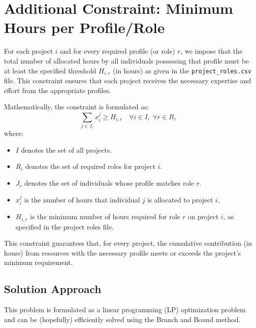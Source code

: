\documentclass{article}
\begin{document}
\section*{Additional Constraint: Minimum Hours per Profile/Role}

For each project \( i \) and for every required profile (or role) \( r \), we impose that the total number of allocated hours by all individuals possessing that profile must be at least the specified threshold \( H_{i,r} \) (in hours) as given in the \texttt{project\_roles.csv} file. This constraint ensures that each project receives the necessary expertise and effort from the appropriate profiles.

Mathematically, the constraint is formulated as:
\[
\sum_{j \in J_r} x_i^j \ge H_{i,r} \quad \forall i \in I,\; \forall r \in R_i
\]
where:
\begin{itemize}
	\item \( I \) denotes the set of all projects.
	\item \( R_i \) denotes the set of required roles for project \( i \).
	\item \( J_r \) denotes the set of individuals whose profile matches role \( r \).
	\item \( x_i^j \) is the number of hours that individual \( j \) is allocated to project \( i \).
	\item \( H_{i,r} \) is the minimum number of hours required for role \( r \) on project \( i \), as specified in the project roles file.
\end{itemize}

This constraint guarantees that, for every project, the cumulative contribution (in hours) from resources with the necessary profile meets or exceeds the project's minimum requirement.


\subsection*{Solution Approach}
This problem is formulated as a linear programming (LP) optimization problem and can be (hopefully) efficiently solved using the Branch and Bound method.

	
\end{document}
